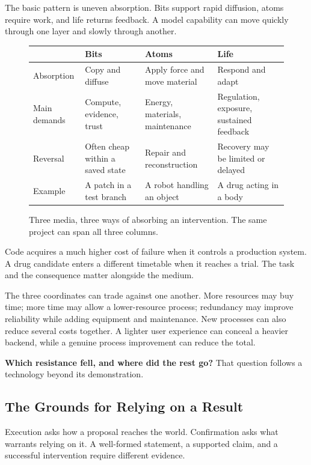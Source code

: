\documentclass[11pt,openany]{book}
\newcommand{\key}[1]{\textbf{#1}}
\begin{document}
The basic pattern is uneven absorption. Bits support rapid diffusion, atoms require work, and life returns feedback. A model capability can move quickly through one layer and slowly through another.

\begin{figure}[ht]
\centering
\begin{tabularx}{\textwidth}{@{}lYYY@{}}
\toprule
 & \textbf{Bits} & \textbf{Atoms} & \textbf{Life}\\
\midrule
Absorption & Copy and diffuse & Apply force and move material & Respond and adapt\\
Main demands & Compute, evidence, trust & Energy, materials, maintenance & Regulation, exposure, sustained feedback\\
Reversal & Often cheap within a saved state & Repair and reconstruction & Recovery may be limited or delayed\\
Example & A patch in a test branch & A robot handling an object & A drug acting in a body\\
\bottomrule
\end{tabularx}
\caption{Three media, three ways of absorbing an intervention. The same project can span all three columns.}
\label{fig:media-gradient}
\end{figure}


Code acquires a much higher cost of failure when it controls a production system. A drug candidate enters a different timetable when it reaches a trial. The task and the consequence matter alongside the medium.

The three coordinates can trade against one another. More resources may buy time; more time may allow a lower-resource process; redundancy may improve reliability while adding equipment and maintenance. New processes can also reduce several costs together. A lighter user experience can conceal a heavier backend, while a genuine process improvement can reduce the total.

\key{Which resistance fell, and where did the rest go?} That question follows a technology beyond its demonstration.

\subsection{The Grounds for Relying on a Result}

Execution asks how a proposal reaches the world. Confirmation asks what warrants relying on it. A well-formed statement, a supported claim, and a successful intervention require different evidence.
\end{document}
